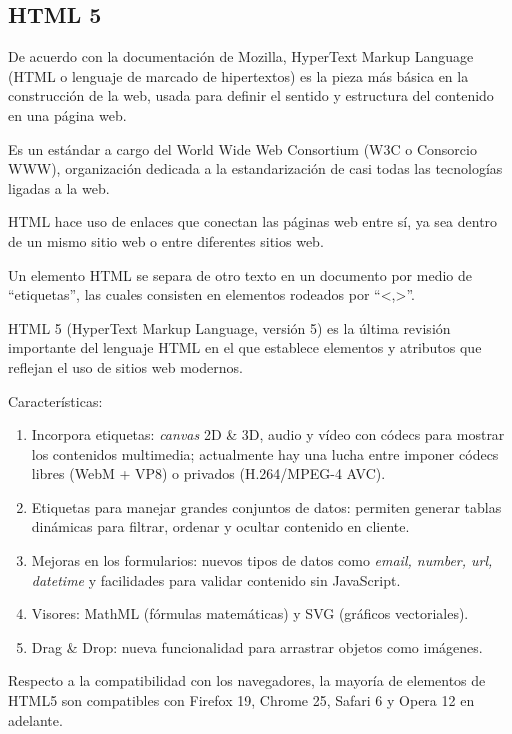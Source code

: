 \subsection{HTML 5 }

De acuerdo con la documentación de Mozilla\cite{noauthor_html_nodate}, HyperText Markup Language (HTML o lenguaje de marcado de hipertextos) es la pieza más básica en la construcción de la web, usada para definir el sentido y estructura del contenido en una página web. 


Es un estándar a cargo del World Wide Web Consortium (W3C o Consorcio WWW), organización dedicada a la estandarización de casi todas las tecnologías ligadas a la web. 


HTML hace uso de enlaces que conectan las páginas web entre sí, ya sea dentro de un mismo sitio web o entre diferentes sitios web.


Un elemento HTML se separa de otro texto en un documento por medio de ``etiquetas'', las cuales consisten en elementos rodeados por ``<,>''.


HTML 5 (HyperText Markup Language, versión 5) es la última revisión importante del lenguaje HTML en el que establece elementos y atributos que reflejan el uso de sitios web modernos. 


Características:

\begin{enumerate}
    \item Incorpora etiquetas: \textit{canvas} 2D \& 3D, audio y vídeo con códecs para mostrar los contenidos multimedia; actualmente hay una lucha entre imponer códecs libres (WebM + VP8) o privados (H.264/MPEG-4 AVC).
    \item Etiquetas para manejar grandes conjuntos de datos: permiten generar tablas dinámicas para filtrar, ordenar y ocultar contenido en cliente.
    \item Mejoras en los formularios: nuevos tipos de datos como \textit{email, number, url, datetime}  y facilidades para validar contenido sin JavaScript.
    \item Visores: MathML (fórmulas matemáticas) y SVG (gráficos vectoriales).
    \item Drag \& Drop: nueva funcionalidad para arrastrar objetos como imágenes.
\end{enumerate}

Respecto a la compatibilidad con los navegadores, la mayoría de elementos de HTML5 son compatibles con Firefox 19, Chrome 25, Safari 6 y Opera 12 en adelante.

